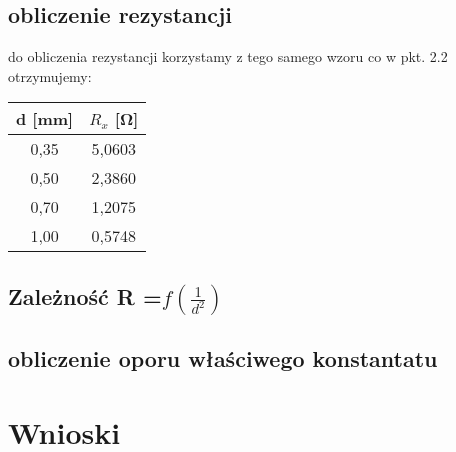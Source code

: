 \documentclass{article}
\begin{document}
\subsection{obliczenie rezystancji}
do obliczenia rezystancji korzystamy z tego samego wzoru co w pkt. 2.2\\
otrzymujemy: \\

\begin{center}
\begin{tabular}{ c | c }
d [mm] & $R_x$ [\si{\ohm}]\\
\hline
0,35 & 5,0603\\ 
 0,50 & 2,3860\\ 
 0,70 & 1,2075\\ 
 1,00 & 0,5748\\ 
 
\end{tabular}
\end{center}

\subsection {Zależność R =$ f(\frac{1}{d^2})$}

\subsection {obliczenie oporu właściwego konstantatu}

\section{Wnioski}
	
\end{document}
